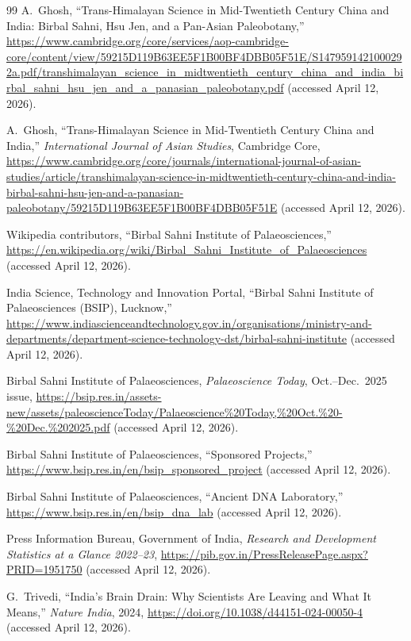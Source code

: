 \documentclass[10pt]{article}
\begin{document}
\begin{thebibliography}{99}
A.~Ghosh, ``Trans-Himalayan Science in Mid-Twentieth Century China and India:
Birbal Sahni, Hsu Jen, and a Pan-Asian Paleobotany,''
\url{https://www.cambridge.org/core/services/aop-cambridge-core/content/view/59215D119B63EE5F1B00BF4DBB05F51E/S1479591421000292a.pdf/transhimalayan_science_in_midtwentieth_century_china_and_india_birbal_sahni_hsu_jen_and_a_panasian_paleobotany.pdf}
(accessed April 12, 2026).

A.~Ghosh, ``Trans-Himalayan Science in Mid-Twentieth Century China and India,''
\textit{International Journal of Asian Studies}, Cambridge Core,
\url{https://www.cambridge.org/core/journals/international-journal-of-asian-studies/article/transhimalayan-science-in-midtwentieth-century-china-and-india-birbal-sahni-hsu-jen-and-a-panasian-paleobotany/59215D119B63EE5F1B00BF4DBB05F51E}
(accessed April 12, 2026).

Wikipedia contributors, ``Birbal Sahni Institute of Palaeosciences,''
\url{https://en.wikipedia.org/wiki/Birbal_Sahni_Institute_of_Palaeosciences}
(accessed April 12, 2026).

India Science, Technology and Innovation Portal, ``Birbal Sahni Institute of
Palaeosciences (BSIP), Lucknow,''
\url{https://www.indiascienceandtechnology.gov.in/organisations/ministry-and-departments/department-science-technology-dst/birbal-sahni-institute}
(accessed April 12, 2026).

Birbal Sahni Institute of Palaeosciences, \textit{Palaeoscience Today},
Oct.--Dec.\ 2025 issue,
\url{https://bsip.res.in/assets-new/assets/paleoscienceToday/Palaeoscience%20Today,%20Oct.%20-%20Dec.%202025.pdf}
(accessed April 12, 2026).

Birbal Sahni Institute of Palaeosciences, ``Sponsored Projects,''
\url{https://www.bsip.res.in/en/bsip_sponsored_project} (accessed April 12, 2026).

Birbal Sahni Institute of Palaeosciences, ``Ancient DNA Laboratory,''
\url{https://www.bsip.res.in/en/bsip_dna_lab} (accessed April 12, 2026).

Press Information Bureau, Government of India,
\textit{Research and Development Statistics at a Glance 2022--23},
\url{https://pib.gov.in/PressReleasePage.aspx?PRID=1951750}
(accessed April 12, 2026).

G.~Trivedi, ``India's Brain Drain: Why Scientists Are Leaving and What It
Means,'' \textit{Nature India}, 2024,
\url{https://doi.org/10.1038/d44151-024-00050-4} (accessed April 12, 2026).


\end{thebibliography}
\end{document}
